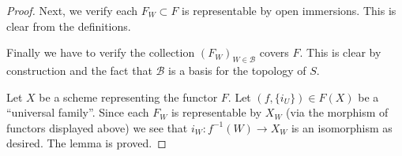 \documentclass{stacks-project}
\theoremstyle{plain}
\theoremstyle{definition}
\theoremstyle{remark}
\numberwithin{equation}{subsection}
\begin{document}
\begin{proof}
\medskip\noindent
Next, we verify each $F_W \subset F$ is representable by open immersions.
This is clear from the definitions.

\medskip\noindent
Finally we have to verify
the collection $(F_W)_{W \in \mathcal{B}}$ covers $F$.
This is clear by construction and the fact that $\mathcal{B}$ is
a basis for the topology of $S$.

\medskip\noindent
Let $X$ be a scheme representing the functor $F$.
Let $(f, \{i_U\}) \in F(X)$ be a ``universal family''.
Since each $F_W$ is representable by $X_W$ (via the morphism of functors
displayed above) we see that $i_W : f^{-1}(W) \to X_W$
is an isomorphism as desired. The lemma is proved.
\end{proof}
\end{document}
